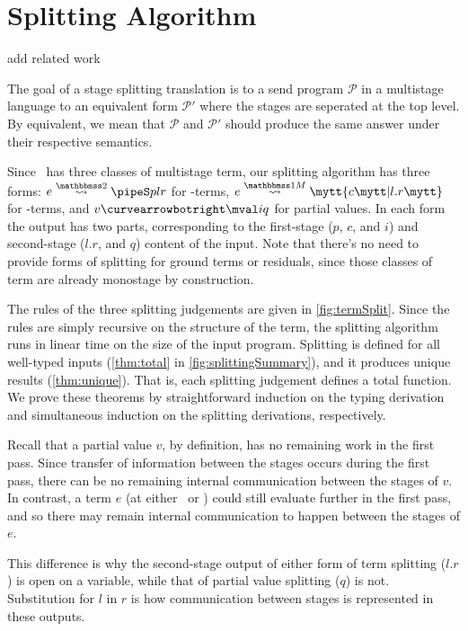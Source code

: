 
\section{Splitting Algorithm}
\label{sec:splitting}



\TODO add related work

\begin{abstrsyn}

The goal of a stage splitting translation 
is to a send program $\mathcal P$ in a multistage language
to an equivalent form $\mathcal P'$ where the stages are seperated at the top level.
By equivalent, we mean that $\mathcal P$ and $\mathcal P'$ should produce 
the same answer under their respective semantics.

Since \lang\ has three classes of multistage term, 
our splitting algorithm has three forms: 
$\splittwo e A p l r$ for \bbtwo-terms, 
$\splitone e A c {l.r}$ for \bbonem-terms, and 
$v \vsplito \mval i q$ for partial values.
In each form the output has two parts, corresponding to the
first-stage ($p$, $c$, and $i$) and second-stage ($l.r$, and $q$) content of the input.
Note that there's no need to provide forms of splitting for ground terms or residuals,
since those classes of term are already monostage by construction.

The rules of the three splitting judgements are given in \ref{fig:termSplit}.
Since the rules are simply recursive on the structure of the term, 
the splitting algorithm runs in linear time on the size of the input program.
Splitting is defined for all well-typed inputs (\ref{thm:total} in \ref{fig:splittingSummary}), and it produces unique results (\ref{thm:unique}).
That is, each splitting judgement defines a total function.
We prove these theorems by straightforward induction on the typing derivation
and simultaneous induction on the splitting derivations, respectively.

Recall that a partial value $v$, by definition, has no remaining work in the first pass.
Since transfer of information between the stages occurs during the first pass, 
there can be no remaining internal communication between the stages of $v$.
In contrast, a term $e$ (at either \bbonem\ or \bbtwo) could still evaluate further in the first pass,
and so there may remain internal communication to happen between the stages of $e$.

This difference is why the second-stage output of either form of term splitting ($l.r$) is open on a variable,
while that of partial value splitting ($q$) is not.
Substitution for $l$ in $r$ is how communication between stages is represented in these outputs.


\end{abstrsyn}
